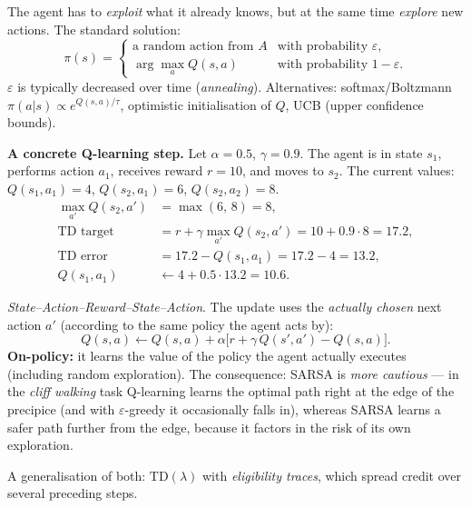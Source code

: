 \documentclass[11pt,a4paper]{article}
\theoremstyle{definition}
\begin{document}
\begin{defbox}
The agent has to \emph{exploit} what it already knows, but at the same time \emph{explore}
new actions. The standard solution:
\[
\pi(s) = \begin{cases}
\text{a random action from } A & \text{with probability } \varepsilon,\\
\arg\max_a Q(s,a) & \text{with probability } 1-\varepsilon .
\end{cases}
\]
$\varepsilon$ is typically decreased over time (\emph{annealing}). Alternatives:
softmax/Boltzmann $\pi(a|s) \propto e^{Q(s,a)/\tau}$, optimistic initialisation of $Q$,
UCB (upper confidence bounds).
\end{defbox}

\medskip
\noindent\textbf{A concrete Q-learning step.} Let $\alpha = 0.5$, $\gamma = 0.9$.
The agent is in state $s_1$, performs action $a_1$, receives reward $r = 10$, and moves to $s_2$.
The current values: $Q(s_1,a_1) = 4$, $Q(s_2,a_1) = 6$, $Q(s_2,a_2) = 8$.
\begin{align*}
\max_{a'} Q(s_2,a') &= \max(6,\,8) = 8, \\
\text{TD target} &= r + \gamma \max_{a'} Q(s_2,a') = 10 + 0.9 \cdot 8 = 17.2, \\
\text{TD error} &= 17.2 - Q(s_1,a_1) = 17.2 - 4 = 13.2, \\
Q(s_1,a_1) &\leftarrow 4 + 0.5 \cdot 13.2 = \mathbf{10.6}.
\end{align*}

\begin{defbox}[SARSA]
\emph{State--Action--Reward--State--Action}. The update uses the \emph{actually chosen}
next action $a'$ (according to the same policy the agent acts by):
\[
Q(s,a) \leftarrow Q(s,a) + \alpha\big[r + \gamma\, Q(s',a') - Q(s,a)\big].
\]
\textbf{On-policy:} it learns the value of the policy the agent actually executes (including random
exploration). The consequence: SARSA is \emph{more cautious} --- in the \emph{cliff walking} task
Q-learning learns the optimal path right at the edge of the precipice (and with
$\varepsilon$-greedy it occasionally falls in), whereas SARSA learns a safer path further from the
edge, because it factors in the risk of its own exploration.

A generalisation of both: $\mathrm{TD}(\lambda)$ with \emph{eligibility traces}, which spread
credit over several preceding steps.
\end{defbox}
\end{document}
